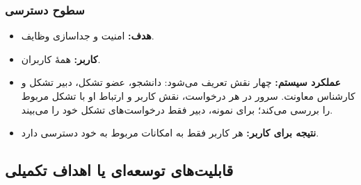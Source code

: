 \documentclass[a4paper,12pt]{article}
\begin{document}
\vspace*{0.5cm}
\subsubsection{سطوح دسترسی}
\begin{itemize}
	\item \textbf{هدف:} امنیت و جداسازی وظایف.
	\item \textbf{کاربر:} همهٔ کاربران.
	\item \textbf{عملکرد سیستم:} چهار نقش تعریف می‌شود: دانشجو، عضو تشکل، دبیر تشکل و کارشناس معاونت. سرور در هر درخواست، نقش کاربر و ارتباط او با تشکل مربوط را بررسی می‌کند؛ برای نمونه، دبیر فقط درخواست‌های تشکل خود را می‌بیند.
	\item \textbf{نتیجه برای کاربر:} هر کاربر فقط به امکانات مربوط به خود دسترسی دارد.
\end{itemize}

\vspace*{1cm}
\subsection{قابلیت‌های توسعه‌ای یا اهداف تکمیلی}\label{sec:stretch}
\end{document}
